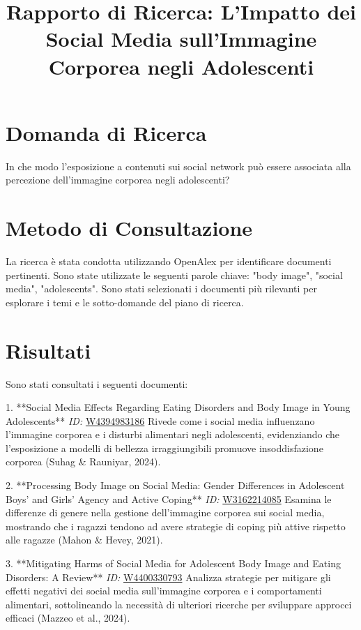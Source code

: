 \documentclass{article}
\title{Rapporto di Ricerca: L'Impatto dei Social Media sull'Immagine Corporea negli Adolescenti}
\author{}
\date{}
\begin{document}
\maketitle

\section{Domanda di Ricerca}
In che modo l'esposizione a contenuti sui social network può essere associata alla percezione dell'immagine corporea negli adolescenti?

\section{Metodo di Consultazione}
La ricerca è stata condotta utilizzando OpenAlex per identificare documenti pertinenti. Sono state utilizzate le seguenti parole chiave: "body image", "social media", "adolescents". Sono stati selezionati i documenti più rilevanti per esplorare i temi e le sotto-domande del piano di ricerca.

\section{Risultati}
Sono stati consultati i seguenti documenti:

1. **Social Media Effects Regarding Eating Disorders and Body Image in Young Adolescents**  
   \textit{ID:} \href{https://openalex.org/W4394983186}{W4394983186}  
   Rivede come i social media influenzano l'immagine corporea e i disturbi alimentari negli adolescenti, evidenziando che l'esposizione a modelli di bellezza irraggiungibili promuove insoddisfazione corporea (Suhag \& Rauniyar, 2024).

2. **Processing Body Image on Social Media: Gender Differences in Adolescent Boys’ and Girls’ Agency and Active Coping**  
   \textit{ID:} \href{https://openalex.org/W3162214085}{W3162214085}  
   Esamina le differenze di genere nella gestione dell'immagine corporea sui social media, mostrando che i ragazzi tendono ad avere strategie di coping più attive rispetto alle ragazze (Mahon \& Hevey, 2021).

3. **Mitigating Harms of Social Media for Adolescent Body Image and Eating Disorders: A Review**  
   \textit{ID:} \href{https://openalex.org/W4400330793}{W4400330793}  
   Analizza strategie per mitigare gli effetti negativi dei social media sull'immagine corporea e i comportamenti alimentari, sottolineando la necessità di ulteriori ricerche per sviluppare approcci efficaci (Mazzeo et al., 2024).
\end{document}
